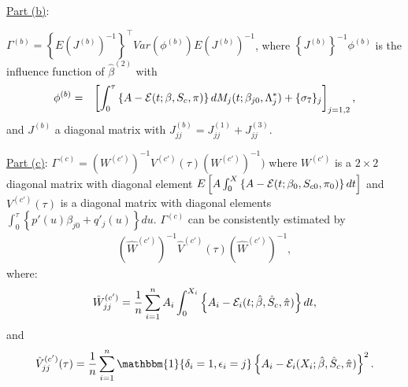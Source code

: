 \documentclass[11pt]{article}
\newcommand{\ee}{\end{eqnarray}}
\newcommand{\eqnn}{\begin{eqnarray*}}
\newcommand{\een}{\end{eqnarray*}}
\newcommand{\be}{\begin{eqnarray}}
\begin{document}
\underline{Part (b)}:

$\Gamma^{(b)}=\left\{{E}(J^{(b)})^{-1}\right\}^\top{Var}(\phi^{(b)}){E}(J^{(b)})^{-1}$, where
$\left\{J^{(b)}\right\}^{-1}\phi^{(b)}$ is the influence function of $\hat \beta^{(2)} $ with 
\eqnn\phi^{(b)}&=&\left[\int_0^\tau \left\{A -{\cal E}(t; \beta, S_c,\pi)\right\}dM_{j}(t; \beta_{j0},\Lambda^{*}_j)+\{\sigma_{7}\}_j\right]_{j=1,2},\een
and $J^{(b)}$  a diagonal matrix with
$
J^{(b)}_{jj}=J^{(1)}_{jj}+J^{(3)}_{jj}
$.


\underline{Part (c)}:
$\Gamma^{(c)}=(W^{(c')})^{-1}V^{(c')}(\tau)(W^{(c')})^{-1})$ where
$W^{(c')}$ is a $2\times2$ diagonal matrix with diagonal element
${E}\left[A\int_0^{X}\left\{A-{\cal E}(t; \beta_0, S_{c0}, \pi_0)\right\}dt\right]$
and $V^{(c')}(\tau)$ is a diagonal matrix with diagonal elements $\int_0^\tau  \left\{p'(u)\beta_{j0}+q'_j(u)\right\}du$.
$\Gamma^{(c)}$ can be consistently estimated by 
\be\label{score2v}
(\hat{W}^{(c')})^{-1}\hat V^{(c')}(\tau)(\hat{W}^{(c')})^{-1},
\ee
where:
\eqnn
\hat{W}^{(c')}_{jj}=\frac{1}{n}\sum_{i=1}^nA_i\int_0^{X_i}\left\{A_i-{\cal E}_i(t; \hat \beta, \hat S_c,\hat \pi )\right\}dt,
\een
and
\eqnn
\hat V^{(c')}_{jj}(\tau)=\frac{1}{n}\sum_{i=1}^n \mathbbm{1}\{\delta_i=1,\epsilon_i=j\} \left\{A_i-{\cal E}_i (X_i; \hat \beta, \hat S_c,\hat \pi )\right\}^2.
\een

















\end{document}
